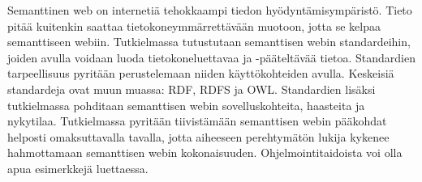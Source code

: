 \documentclass[finnish, 12pt, a4paper, elec, utf8, pdfa, online]{aaltothesis}
\date{24.4.2018}
\begin{document}
\makecoverpage

\makecopyrightpage

\begin{abstractpage}[finnish]
Semanttinen web on internetiä tehokkaampi tiedon hyödyntämisympäristö. Tieto pitää kuitenkin saattaa tietokoneymmärrettävään muotoon, jotta se kelpaa semanttiseen webiin. Tutkielmassa tutustutaan semanttisen webin standardeihin, joiden avulla voidaan luoda tietokoneluettavaa ja -pääteltävää tietoa. Standardien tarpeellisuus pyritään perustelemaan niiden käyttökohteiden avulla. Keskeisiä standardeja ovat muun muassa: RDF, RDFS ja OWL. Standardien lisäksi tutkielmassa pohditaan semanttisen webin sovelluskohteita, haasteita ja nykytilaa. Tutkielmassa pyritään tiivistämään semanttisen webin pääkohdat helposti omaksuttavalla tavalla, jotta aiheeseen perehtymätön lukija kykenee hahmottamaan semanttisen webin kokonaisuuden. Ohjelmointitaidoista voi olla apua esimerkkejä luettaessa.
\end{abstractpage}


\newpage







\end{document}
